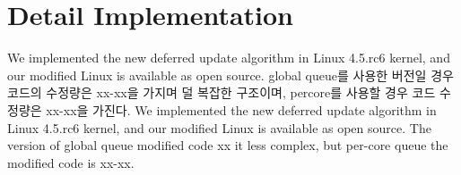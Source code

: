 \section{Detail Implementation}\label{sec:implementation}

\ifkor
We implemented the new deferred update algorithm in Linux 4.5.rc6 kernel, and
our modified Linux is available as open source. 
global queue를 사용한 버전일 경우 코드의 수정량은 xx-xx을 가지며 덜 복잡한 구조이며, 
percore를 사용할 경우 코드 수정량은 xx-xx을 가진다. 
\else
We implemented the new deferred update algorithm in Linux 4.5.rc6 kernel, and
our modified Linux is available as open source. 
The version of global queue modified code xx it less complex, but per-core queue
the modified code is xx-xx.
\fi

